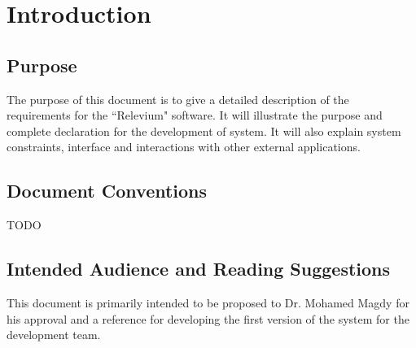 \documentclass{scrreprt}
\begin{document}
\chapter{Introduction}

\section{Purpose}

The purpose of this document is to give a detailed description of the requirements for the ``Relevium" software. It will illustrate the purpose and complete declaration for the development of system. It will also explain system constraints, interface and interactions with other external applications.

\section{Document Conventions}

TODO

\section{Intended Audience and Reading Suggestions}

This document is primarily intended to be proposed to Dr. Mohamed Magdy for his approval and a reference for developing the first version of the system for the development team.
\end{document}
